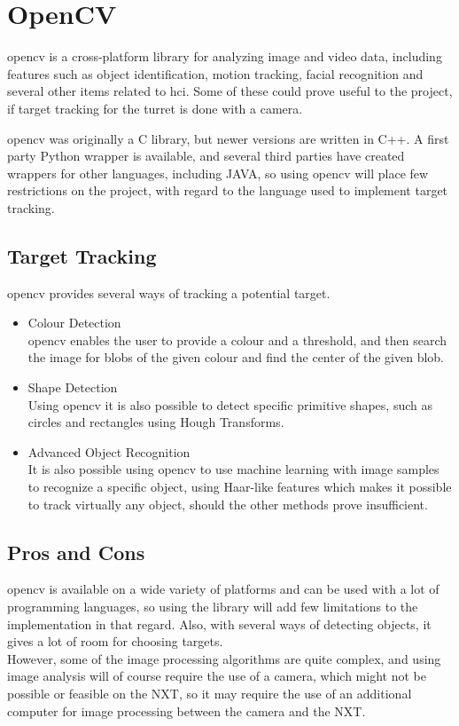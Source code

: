 \section{OpenCV}

\ac{opencv}\cite{opencv} is a cross-platform library for analyzing image and video data, including features such
as object identification, motion tracking, facial recognition and several other items related to \ac{hci}. 
Some of these could prove useful to the project, if target tracking for the turret is done with a camera.

\ac{opencv} was originally a C library, but newer versions are written in C++. A first party Python wrapper is
available, and several third parties have created wrappers for other languages, including JAVA\cite{javacv}, so
using \ac{opencv} will place few restrictions on the project, with regard to the language used to implement
target tracking.

\subsection{Target Tracking}
\ac{opencv} provides several ways of tracking a potential target.
\begin{itemize}
  \item{Colour Detection}\\
  \ac{opencv} enables the user to provide a colour and a threshold, and then search the image for blobs of the
  given colour and find the center of the given blob.
  \item{Shape Detection}\\
  Using \ac{opencv} it is also possible to detect specific primitive shapes, such as circles and rectangles using
  Hough Transforms\cite{hough2003}.
  \item{Advanced Object Recognition}\\
  It is also possible using \ac{opencv} to use machine learning with image samples to recognize a specific
  object, using Haar-like features\cite{lienhart2002} which makes it possible to track virtually any object,
  should the other methods prove insufficient.
\end{itemize}

\subsection{Pros and Cons}
\ac{opencv} is available on a wide variety of platforms and can be used with a lot of programming languages,
so using the library will add few limitations to the implementation in that regard. Also, with several ways
of detecting objects, it gives a lot of room for choosing targets.\\
However, some of the image processing algorithms are quite complex, and using image analysis will of course
require the use of a camera, which might not be possible or feasible on the NXT, so it may require the
use of an additional computer for image processing between the camera and the NXT.
